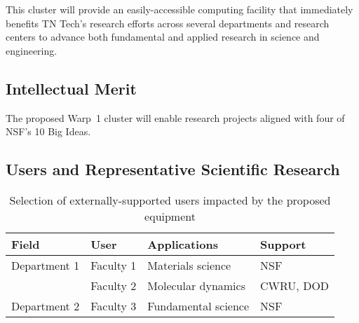 \documentclass[10pt]{nsf-proposal}
\begin{document}
This cluster will provide an easily-accessible computing facility that immediately benefits TN Tech's research efforts across several departments and research centers to advance both fundamental and applied research in science and engineering.

\subsection{Intellectual Merit}

The proposed Warp~1 cluster will enable research projects aligned with four of NSF's 10 Big Ideas.

\subsection{Users and Representative Scientific Research}

\begin{table}
\centering
\caption{\label{tab:users} Selection of externally-supported users impacted by the proposed equipment}
\begin{tabular}{P{1.7in}P{1.5in}P{1.6in}P{1.25in}} \toprule
{\bfseries Field} & {\bfseries User} & {\bfseries Applications} & {\bfseries Support} \\ \midrule
Department 1 & Faculty 1 & Materials science & NSF \\
             & Faculty 2 & Molecular dynamics & CWRU, DOD \\ \addlinespace

Department 2 & Faculty 3 & Fundamental science & NSF \\ \bottomrule
\end{tabular}
\end{table}
\end{document}
